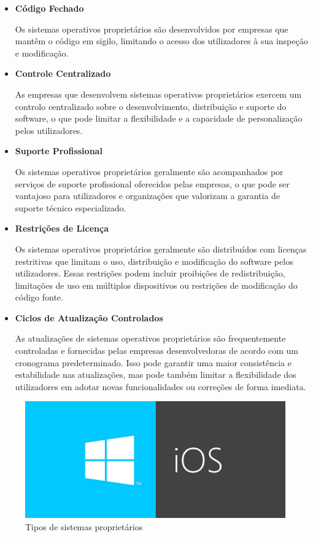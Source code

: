 \begin{itemize}
  \item \textbf{Código Fechado}
  
      Os sistemas operativos proprietários são desenvolvidos por empresas que mantêm o código em sigilo, limitando o acesso dos utilizadores à sua inspeção e modificação.
  
  \item \textbf{Controle Centralizado}
  
      As empresas que desenvolvem sistemas operativos proprietários exercem um controlo centralizado sobre o desenvolvimento, distribuição e suporte do software, o que pode limitar a flexibilidade e a capacidade de personalização pelos utilizadores.
  
  \item \textbf{Suporte Profissional}
  
      Os sistemas operativos proprietários geralmente são acompanhados por serviços de suporte profissional oferecidos pelas empresas, o que pode ser vantajoso para utilizadores e organizações que valorizam a garantia de suporte técnico especializado.
  
  \item \textbf{Restrições de Licença}

      Os sistemas operativos proprietários geralmente são distribuídos com licenças restritivas que limitam o uso, distribuição e modificação do software pelos utilizadores. Essas restrições podem incluir proibições de redistribuição, limitações de uso em múltiplos dispositivos ou restrições de modificação do código fonte.
  
  \item \textbf{Ciclos de Atualização Controlados}
  
      As atualizações de sistemas operativos proprietários são frequentemente controladas e fornecidas pelas empresas desenvolvedoras de acordo com um cronograma predeterminado. Isso pode garantir uma maior consistência e estabilidade nas atualizações, mas pode também limitar a flexibilidade dos utilizadores em adotar novas funcionalidades ou correções de forma imediata.
\end{itemize}

\begin{figure}[H]
  \centering
  \includegraphics[scale=0.2]{Figures/0. General/sistemas_proprietarios.jpg}
  \caption{Tipos de sistemas proprietários}
  \label{Tipos de sistemas proprietários}
\end{figure}
